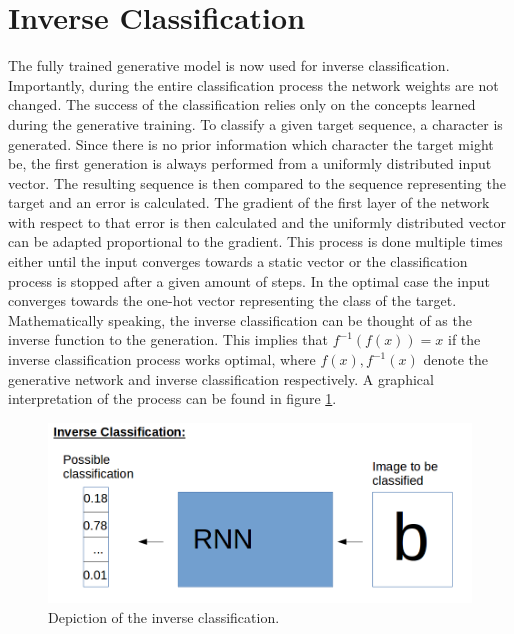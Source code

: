 \section{Inverse Classification}

The fully trained generative model is now used for inverse classification. Importantly, during the entire classification process the network weights are not changed. The success of the classification relies only on the concepts learned during the generative training. To classify a given target sequence, a character is generated. Since there is no prior information which character the target might be, the first generation is always performed from a uniformly distributed input vector. The resulting sequence is then compared to the sequence representing the target and an error is calculated. The gradient of the first layer of the network with respect to that error is then calculated and the uniformly distributed vector can be adapted proportional to the gradient. This process is done multiple times either until the input converges towards a static vector or the classification process is stopped after a given amount of steps. In the optimal case the input converges towards the one-hot vector representing the class of the target. Mathematically speaking, the inverse classification can be thought of as the inverse function to the generation. This implies that $f^{-1}(f(x)) = x$ if the inverse classification process works optimal, where $f(x), f^{-1}(x)$ denote the generative network and inverse classification respectively. A graphical interpretation of the process can be found in figure \ref{fig:inverse_classification}. 

\begin{figure}[!htb]
	\centering
	\includegraphics[width=\textwidth]{images/inverse_classification.png}
	\caption{Depiction of the inverse classification.}
	\label{fig:inverse_classification}
\end{figure}

